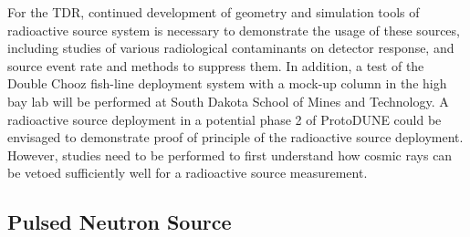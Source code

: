 For the TDR, continued development of geometry and simulation tools of radioactive source system is necessary to demonstrate the usage of these sources, including studies of various radiological contaminants on detector response, and source event rate and methods to suppress them. In addition, a test of the Double Chooz fish-line deployment system with a  mock-up column in the high bay lab will be performed at South Dakota School of Mines and Technology. A radioactive source deployment in a potential phase 2 of ProtoDUNE could be envisaged to demonstrate proof of principle of the radioactive source deployment. However, studies need to be performed to first understand how cosmic rays can be vetoed sufficiently well for a radioactive source measurement.

\subsection{Pulsed Neutron Source}  %
\label{sec:neutron}

